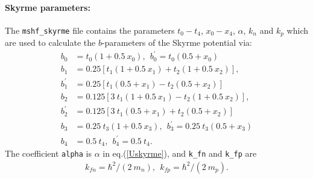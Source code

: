 \documentclass[3p]{elsarticle}
\begin{document}
\paragraph{Skyrme parameters:} The \texttt{mshf\_skyrme} file contains the parameters $t_0 - t_4$, $x_0 - x_4$, $\alpha$, $k_{n}$ and $k_p$ which are used to calculate the $b$-parameters of the Skyrme potential via:
\begin{align}
b_0 &= t_0 \left( 1 + 0.5 \: x_0 \right), \:\: b^{\prime}_0 = t_0 \left( 0.5 + x_0 \right)\\
b_1 &= 0.25 \left[ t_1 \left( 1 + 0.5 \: x_1 \right) + t_2 \left( 1 + 0.5 \: x_2 \right) \right], \\
b^{\prime}_1 &= 0.25 \left[ t_1 \left( 0.5 + x_1 \right) - t_2 \left( 0.5 + x_2 \right) \right] \\ 
b_2 &= 0.125 \left[ 3\: t_1 \left( 1 + 0.5 \: x_1 \right) - t_2 \left( 1 + 0.5 \: x_2 \right) \right],\\ 
b^{\prime}_2 &= 0.125 \left[ 3 \: t_1 \left( 0.5 + x_1 \right) + t_2 \left( 0.5 + x_2 \right) \right] \\
b_3 &= 0.25 \: t_3 \left( 1 + 0.5 \: x_3 \right), \:\: b^{\prime}_3 = 0.25 \: t_3 \left( 0.5 + x_3 \right)\\
b_4 &= 0.5 \: t_4, \:\: b^{\prime}_4 = 0.5 \: t_4. 
\end{align}
The coefficient \texttt{alpha} is $\alpha$ in eq.(\ref{Uskyrme}), and \texttt{k\_fn} and \texttt{k\_fp} are
\begin{align}
k_{fn} = \hbar^2 / (2 \: m_n), \:\: k_{fp} = \hbar^2 / (2 \: m_p).
\end{align}
\end{document}
